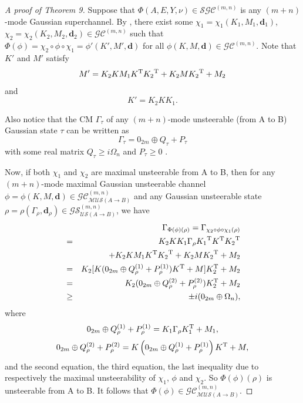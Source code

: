 \documentclass[10pt,aps,pra,amsfonts,amssymb,amsmath,%
floatfix,nofootinbib, groupedaddress,superscriptaddress,citesort,twocolumn
]{revtex4}%
\begin{document}
    \begin{proof}[A proof of Theorem 9]

Suppose  that   $\Phi \left( A,E,Y,\nu \right) \in  {\mathcal {SGC}}^{(m,n)} $ is  any  $(m+n)$-mode Gaussian superchannel.
By \cite{X11},   there exist some  $\chi_1=\chi_1( K_1, M_1,\mathbf d_1 )$, $\chi_2=\chi_2(K_2, M_2, \mathbf d_2 ) \in {\mathcal {GC}}^{(m,n)}$   such that
$\Phi \left( \phi  \right) = {\chi_2} \circ \phi  \circ \chi_1=\phi'(K',M',\mathbf d)$ for all  $ \phi \left( K,M,\mathbf d \right) \in \mathcal {GC}^{(m,n)}$.  Note that  $K'$ and $M'$ satisfy  
$$M' ={K_2}K{M_1}{K^{\rm T}}{K_2}^{\rm T} + {K_2}M{K_2}^{\rm T} + {M_2}$$ and 
$$K'=K_2{K}K_1. $$

Also
notice that  the CM $\Gamma_\tau$ of any $(m+n)$-mode unsteerable (from A to B) Gaussian state $\tau$  can be written as $$\Gamma_{\tau} =   0_{2m} \oplus Q_{\tau}  +P_{\tau}$$
with some real matrix $Q_{\tau}\ge i{\Omega _n}$ and $ P_{\tau}\geq 0$ \cite{MKIB}.

Now, if both $\chi_1$ and $\chi_2$ are maximal unsteerable from A to B,  then for any $(m+n)$-mode maximal Gaussian unsteerable channel   $ \phi=\phi \left( K,M,\mathbf d \right) \in {\mathcal {GC}}^{(m,n)}_{\mathcal {MUS}(A \rightarrow B)} $ and any Gaussian unsteerable state $\rho=\rho(\Gamma_\rho,\mathbf d_\rho)\in {\mathcal {GS}}^{(m,n)}_{\mathcal {US}(A \rightarrow B)}$,
we have 
\begin{eqnarray*}
	&&\Gamma_{\Phi \left( \phi  \right)(\rho)}=\Gamma _{{\chi_2} \circ \phi  \circ {\chi_1}( \rho )}\\
	&=&{K}_2K{K_1}\Gamma_\rho{K_1}^{\rm T}{K^{\rm T}}{K_2}^{\rm T}\\
	&&+{K_2}K{M_1}{K^{\rm T}}{K_2}^{\rm T} + {K_2}M{K_2}^{\rm T} + {M_2}\\
	&=& {K}_2[K( 0_{2m} \oplus Q_{\rho}^{(1)} + P_{\rho}^{(1)} )K^{\rm T}+M]{K}_2^{\rm T}+M_2\\
	&=& {K}_2( 0_{2m} \oplus Q_{\rho}^{(2)} +P_{\rho}^{(2)}){K}_2^{\rm T}+M_2\\
	&\ge& \pm i(0_{2m} \oplus {\Omega _n}),
\end{eqnarray*}
where
$$0_{2m} \oplus Q_{\rho}^{(1)} + P_{\rho}^{(1)}=K_1\Gamma_{\rho} K_1^{\rm T}+M_1,$$
$$ 0_{2m} \oplus Q_{\rho}^{(2)} +P_{\rho}^{(2)}=K\left(  0_{2m} \oplus Q_{\rho}^{(1)} + P_{\rho}^{(1)} \right)K^{\rm T}+M ,$$
and	the second equation, the third equation,  the last inequality due to respectively the maximal unsteerability of $\chi_1$, $\phi$  and $\chi_2$.  So $\Phi(\phi)(\rho)$ is unsteerable from A to B. 
It follows  that  $\Phi \left( \phi  \right) \in {\mathcal {GC}}^{(m,n)}_{\mathcal {MUS}(A \rightarrow B)} $.





\end{proof}
\end{document}
